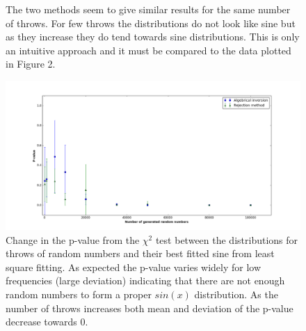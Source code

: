 \documentclass[10 pt]{article}
\numberwithin{equation}{section}
\begin{document}
\begin{figure}[H]
\centering
{}
\newline
{}
\caption{The two methods seem to give similar results for the same number of throws. For few throws the distributions do not look like sine but as they increase they do tend towards sine distributions. This is only an intuitive approach and it must be compared to the data plotted in Figure 2.}
\end{figure}


\begin{figure}[H]
\includegraphics[width=\linewidth]{p_value}
\caption{Change in the p-value from the $\chi ^2$ test between the distributions for throws of random numbers and their best fitted sine from least square fitting. As expected the p-value varies widely for low frequencies (large deviation) indicating that there are not enough random numbers to form a proper $sin(x)$ distribution. As the number of throws increases both mean and deviation of the p-value decrease towards 0.}
\end{figure}
\end{document}
